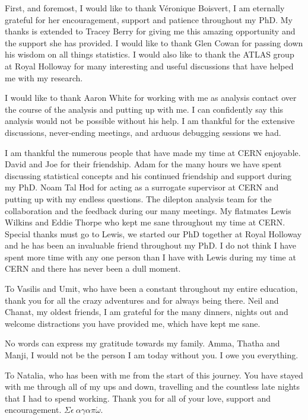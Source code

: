 \cleardoublepage{}
\begin{acknowledgements}
    First, and foremost, I would like to thank V\'{e}ronique Boisvert, I am eternally grateful for her encouragement, support and patience throughout my PhD. My thanks is extended to Tracey Berry for giving me this amazing opportunity and the support she has provided. I would like to thank Glen Cowan for passing down his wisdom on all things statistics. I would also like to thank the ATLAS group at Royal Holloway for many interesting and useful discussions that have helped me with my research.

    I would like to thank Aaron White for working with me as analysis contact over the course of the analysis and putting up with me. I can confidently say this analysis would not be possible without his help. I am thankful for the extensive discussions, never-ending meetings, and arduous debugging sessions we had. 
    
    I am thankful the numerous people that have made my time at CERN enjoyable. David and Joe for their friendship. Adam for the many hours we have spent discussing statistical concepts and his continued friendship and support during my PhD. Noam Tal Hod for acting as a surrogate supervisor at CERN and putting up with my endless questions. The dilepton analysis team for the collaboration and the feedback during our many meetings. My flatmates Lewis Wilkins and Eddie Thorpe who kept me sane throughout my time at CERN. Special thanks must go to Lewis, we started our PhD together at Royal Holloway and he has been an invaluable friend throughout my PhD. I do not think I have spent more time with any one person than I have with Lewis during my time at CERN and there has never been a dull moment. 
    
    To Vasilis and Umit, who have been a constant throughout my entire education, thank you for all the crazy adventures and for always being there. Neil and Chanat, my oldest friends, I am grateful for the many dinners, nights out and welcome distractions you have provided me, which have kept me sane. 

    No words can express my gratitude towards my family. Amma, Thatha and Manji, I would not be the person I am today without you. I owe you everything. 

    To Natalia, who has been with me from the start of this journey. You have stayed with me through all of my ups and down, travelling and the countless late nights that I had to spend working. Thank you for all of your love, support and encouragement. $\Sigma\epsilon~ \alpha\gamma\alpha\pi\acute{\omega}$.
    
\end{acknowledgements}

\cleardoublepage{}\tableofcontents
\cleardoublepage{}\listoffigures
\cleardoublepage{}\listoftables

\dedication{In memory of Sudheera Nanayakkara (Ammi)}

